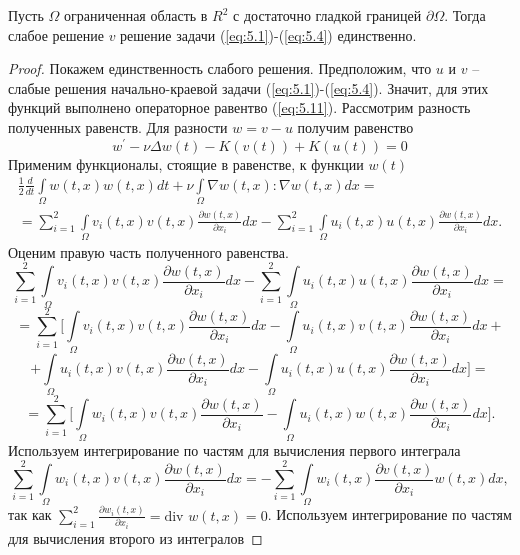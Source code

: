 \begin{theorem}
    Пусть $\Omega$ ограниченная область в $R^2$ с достаточно гладкой границей $\partial\Omega$. Тогда слабое решение $v$  решение
    задачи (\ref{eq:5.1})-(\ref{eq:5.4}) единственно.
\end{theorem}
\begin{proof}
    Покажем единственность слабого решения. Предположим, что $u$ и $v$ -- слабые решения начально-краевой задачи (\ref{eq:5.1})-(\ref{eq:5.4}).
    Значит, для этих функций выполнено операторное равентво (\ref{eq:5.11}). Рассмотрим разность полученных равенств. 
    Для разности $w = v - u$ получим равенство
    $$w^\prime - \nu\Delta w(t) - K(v(t)) + K(u(t)) = 0$$
    Применим функционалы, стоящие в равенстве, к функции $w(t)$
    \begin{equation}\label{eq:5.36}
        \begin{gathered}
            \frac{1}{2}\frac{d}{dt}\int\limits_\Omega w(t, x)w(t, x)dt+\nu\int\limits_{\Omega} \nabla w(t,x):\nabla w(t,x)dx= \\
            =\sum_{i=1}^{2}\int\limits_\Omega v_i(t,x) v(t, x)\frac{\partial w(t, x)}{\partial x_i}dx-\sum_{i=1}^{2}\int\limits_\Omega u_i(t,x)u(t, x)\frac{\partial w(t, x)}{\partial x_i}dx.
        \end{gathered}
    \end{equation}
    Оценим правую часть полученного равенства.
    $$\sum_{i=1}^{2}\int\limits_\Omega v_i(t,x) v(t, x)\frac{\partial w(t, x)}
    {\partial x_i}dx-\sum_{i=1}^{2}\int\limits_\Omega u_i(t,x)u(t, x)\frac{\partial w(t, x)}{\partial x_i}dx=$$
    $$=\sum_{i=1}^{2}\bigg[\int\limits_\Omega v_i(t,x)v(t, x)\frac{\partial w(t, x)}
    {\partial x_i}dx-\int\limits_\Omega u_i(t,x)v(t, x)\frac{\partial w(t, x)}{\partial x_i}dx+$$
    $$+\int\limits_\Omega u_i(t,x) v(t, x)\frac{\partial w(t, x)}
    {\partial x_i}dx-\int\limits_\Omega u_i(t,x) u(t, x)\frac{\partial w(t, x)}{\partial x_i}dx\bigg]=$$
    $$=\sum_{i=1}^{2}\bigg[\int\limits_\Omega w_i(t, x) v(t, x)\frac{\partial w(t, x)}
    {\partial x_i}-\int\limits_\Omega u_i(t,x) w(t, x)\frac{\partial w(t, x)}{\partial x_i}dx\bigg].$$
    Используем интегрирование по частям для вычисления первого интеграла
    $$\sum_{i=1}^{2}\int\limits_\Omega w_i(t, x)v(t, x)\frac{\partial w(t, x)}{\partial x_i}dx=
    -\sum_{i=1}^{2}\int\limits_\Omega w_i(t, x)\frac{\partial v(t, x)}{\partial x_i}w(t, x)dx,$$
    так как $\sum\limits_{i=1}^{2}\frac{\partial w_i(t, x)}{\partial x_i} = \textrm{div } w(t, x)=0$. Используем интегрирование по частям для вычисления второго из интегралов

\end{proof}
